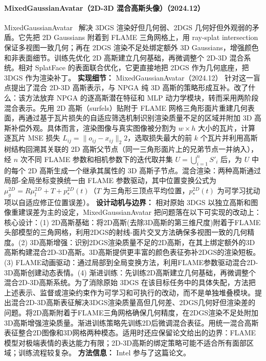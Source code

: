 \paragraph{MixedGaussianAvatar（2D-3D 混合高斯头像）（2024.12）}
MixedGaussianAvatar~\cite{2412_04955} 解决 3DGS 渲染好但几何弱、2DGS 几何好但外观弱的矛盾。它先把 2D Gaussians 附着到 FLAME 三角网格上，用 ray-splat intersection 保证多视图一致几何；再在 2DGS 渲染不足处绑定额外 3D Gaussians，增强颜色和非表面细节。训练先优化 2D 高斯建立几何基础，再微调整个 2D-3D 混合系统。相对 SplatFace 的表面联合优化，它更直接地把 2DGS 作为几何底座，把 3DGS 作为渲染补丁。
\textbf{实现细节：} MixedGaussianAvatar（2024.12） 针对这一盲点提出了混合 2D-3D 高斯表示，与 NPGA 纯 3D 高斯的策略形成互补。改了什么：该方法放弃 NPGA 的逐高斯潜在特征和 MLP 动力学模块，转而采用两阶段混合表示。先用 2D 高斯（surfels）贴附于 FLAME 网格三角形面片重建几何表面，再通过基于瓦片损失的自适应筛选机制识别渲染质量不足的区域并附加 3D 高斯补偿外观。具体而言，渲染图像与真实图像被分割为 $w \times h$ 大小的瓦片，计算逐瓦片 MSE 损失 $L_{ij} = \|o_{ij} - x_{ij}\|_2^{}2$，选取损失最大的前 $k$ 个瓦片并利用高斯树结构回溯其关联的 2D 高斯父节点（同一三角形面片上的兄弟节点一并纳入），经 $n$ 次不同 FLAME 参数和相机参数下的迭代取并集 $U = \bigcup_{i=1}^{n} S'_i$ 后，为 $U$ 中的每个 2D 高斯生成一个继承其属性的 3D 高斯子节点。混合渲染：两种高斯通过局部-全局坐标变换统一由 FLAME 参数驱动，其中位置变换公式为 $\mu_g^{2D} = R \mu_l^{2D} + T + p^{2D}_*(t)$（$T$ 为三角形三顶点平均位置，$p^{2D}_*(t)$ 为可学习扰动项以自适应修正位置误差）。
\textbf{设计动机与边界：} 相对原始 3DGS 以独立高斯和图像重建误差为主的设定，MixedGaussianAvatar 把问题落在以下可实现的改动上：核心设计：(1) 2D高斯基础：将2D高斯(去除3D高斯的第三维尺度)附着于FLAME头部模型的三角网格，利用2DGS的射线-面片交叉方法确保多视图一致的几何精度。(2) 3D高斯增强：识别2DGS渲染质量不足的2D高斯，在其上绑定额外的3D高斯构建混合2D-3D高斯。3D高斯提供更丰富的颜色表征弥补2DGS的渲染短板。(3) FLAME动画驱动：通过局部到全局变换方法，利用FLAME参数驱动混合2D-3D高斯创建动态表情。(4) 渐进训练：先训练2D高斯建立几何基础，再微调整个混合2D-3D高斯系统。为了消除原始 3DGS 在该目标任务中的具体失配，方法把上述表示、监督或渲染约束作为可学习和可执行的改动，而不是单独堆叠模块。提出混合2D-3D高斯表征解决3DGS渲染质量高但几何差、2DGS几何好但渲染差的问题。将2D高斯附着于FLAME三角网格确保几何精度，在2DGS渲染不足处附加3D高斯增强渲染质量。渐进训练策略先训练2D后微调混合表征。用统一混合高斯表征整合2D图像和3D网格两种模态。适用时还应保留论文给出的边界：FLAME模型对极端表情的表达能力有限；2D-3D高斯的绑定策略可能不适合所有面部区域；训练流程较复杂。
\textbf{方法信息：} Intel 参与了这篇论文。



